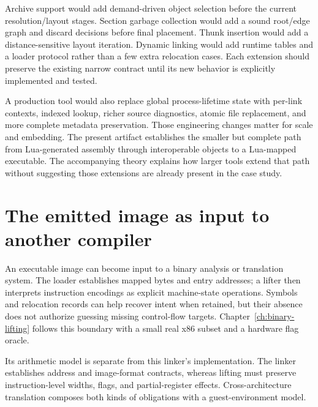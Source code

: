 Archive support would add demand-driven object selection before the current resolution/layout stages.
Section garbage collection would add a sound root/edge graph and discard decisions before final placement.
Thunk insertion would add a distance-sensitive layout iteration.
Dynamic linking would add runtime tables and a loader protocol rather than a few extra relocation cases.
Each extension should preserve the existing narrow contract until its new behavior is explicitly implemented and tested.

A production tool would also replace global process-lifetime state with per-link contexts, indexed lookup, richer source diagnostics, atomic file replacement, and more complete metadata preservation.
Those engineering changes matter for scale and embedding.
The present artifact establishes the smaller but complete path from Lua-generated assembly through interoperable objects to a Lua-mapped executable.
The accompanying theory explains how larger tools extend that path without suggesting those extensions are already present in the case study.

\section{The emitted image as input to another compiler}
\label{sec:ch60-lifting-link}

An executable image can become input to a binary analysis or translation system.
The loader establishes mapped bytes and entry addresses; a lifter then interprets instruction encodings as explicit machine-state operations.
Symbols and relocation records can help recover intent when retained, but their absence does not authorize guessing missing control-flow targets.
Chapter~\ref{ch:binary-lifting} follows this boundary with a small real x86 subset and a hardware flag oracle.

Its arithmetic model is separate from this linker's implementation.
The linker establishes address and image-format contracts, whereas lifting must preserve instruction-level widths, flags, and partial-register effects.
Cross-architecture translation composes both kinds of obligations with a guest-environment model.

